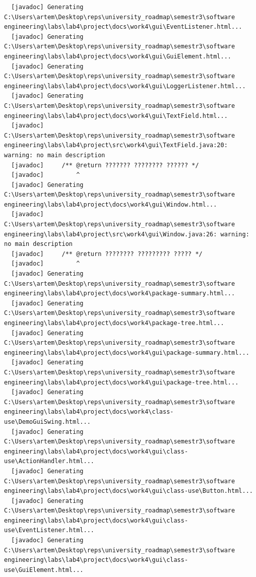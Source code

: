 \documentclass[12pt,a4paper]{article}
\begin{document}
\begin{verbatim}
  [javadoc] Generating C:\Users\artem\Desktop\reps\university_roadmap\semestr3\software engineering\labs\lab4\project\docs\work4\gui\EventListener.html...
  [javadoc] Generating C:\Users\artem\Desktop\reps\university_roadmap\semestr3\software engineering\labs\lab4\project\docs\work4\gui\GuiElement.html...
  [javadoc] Generating C:\Users\artem\Desktop\reps\university_roadmap\semestr3\software engineering\labs\lab4\project\docs\work4\gui\LoggerListener.html...
  [javadoc] Generating C:\Users\artem\Desktop\reps\university_roadmap\semestr3\software engineering\labs\lab4\project\docs\work4\gui\TextField.html...
  [javadoc] C:\Users\artem\Desktop\reps\university_roadmap\semestr3\software engineering\labs\lab4\project\src\work4\gui\TextField.java:20: warning: no main description
  [javadoc]     /** @return ??????? ???????? ?????? */
  [javadoc]         ^
  [javadoc] Generating C:\Users\artem\Desktop\reps\university_roadmap\semestr3\software engineering\labs\lab4\project\docs\work4\gui\Window.html...
  [javadoc] C:\Users\artem\Desktop\reps\university_roadmap\semestr3\software engineering\labs\lab4\project\src\work4\gui\Window.java:26: warning: no main description
  [javadoc]     /** @return ???????? ????????? ????? */
  [javadoc]         ^
  [javadoc] Generating C:\Users\artem\Desktop\reps\university_roadmap\semestr3\software engineering\labs\lab4\project\docs\work4\package-summary.html...
  [javadoc] Generating C:\Users\artem\Desktop\reps\university_roadmap\semestr3\software engineering\labs\lab4\project\docs\work4\package-tree.html...
  [javadoc] Generating C:\Users\artem\Desktop\reps\university_roadmap\semestr3\software engineering\labs\lab4\project\docs\work4\gui\package-summary.html...
  [javadoc] Generating C:\Users\artem\Desktop\reps\university_roadmap\semestr3\software engineering\labs\lab4\project\docs\work4\gui\package-tree.html...
  [javadoc] Generating C:\Users\artem\Desktop\reps\university_roadmap\semestr3\software engineering\labs\lab4\project\docs\work4\class-use\DemoGuiSwing.html...
  [javadoc] Generating C:\Users\artem\Desktop\reps\university_roadmap\semestr3\software engineering\labs\lab4\project\docs\work4\gui\class-use\ActionHandler.html...
  [javadoc] Generating C:\Users\artem\Desktop\reps\university_roadmap\semestr3\software engineering\labs\lab4\project\docs\work4\gui\class-use\Button.html...
  [javadoc] Generating C:\Users\artem\Desktop\reps\university_roadmap\semestr3\software engineering\labs\lab4\project\docs\work4\gui\class-use\EventListener.html...
  [javadoc] Generating C:\Users\artem\Desktop\reps\university_roadmap\semestr3\software engineering\labs\lab4\project\docs\work4\gui\class-use\GuiElement.html...

\end{verbatim}
\end{document}
